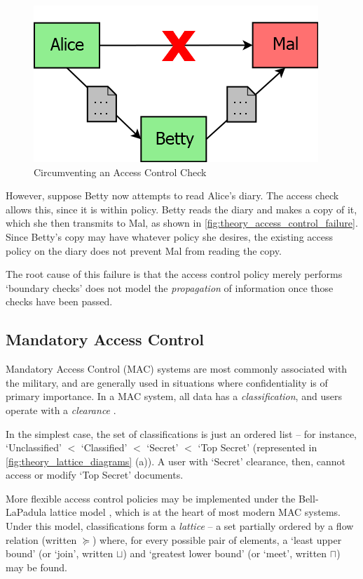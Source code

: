 \begin{figure}[h!]
	\centering
	\includegraphics[scale=0.5]{content/lit_theory/access_control_example.png}
	\caption{Circumventing an Access Control Check}
	\label{fig:theory_access_control_failure}
\end{figure}

However, suppose Betty now attempts to read Alice's diary. The access check allows this, since it is within policy. Betty reads the diary and makes a copy of it, which she then transmits to Mal, as shown in \autoref{fig:theory_access_control_failure}. Since Betty's copy may have whatever policy she desires, the existing access policy on the diary does not prevent Mal from reading the copy.

The root cause of this failure is that the access control policy merely performs `boundary checks' does not model the \textit{propagation} of information once those checks have been passed.

\subsection{Mandatory Access Control} \label{accesscontrol_mac}

Mandatory Access Control (MAC) systems are most commonly associated with the military, and are generally used in situations where confidentiality is of primary importance. In a MAC system, all data has a \textit{classification}, and users operate with a \textit{clearance} \cite{sandhu1994access}. 

In the simplest case, the set of classifications is just an ordered list -- for instance, `Unclassified' $ < $ `Classified' $ < $ `Secret' $ < $ `Top Secret' (represented in \autoref{fig:theory_lattice_diagrams} (a)). A user with `Secret' clearance, then, cannot access or modify `Top Secret' documents.

More flexible access control policies may be implemented under the Bell-LaPadula lattice model \cite{bell1973lattice}, which is at the heart of most modern MAC systems. Under this model, classifications form a \textit{lattice} -- a set partially ordered by a flow relation (written $ \succeq $) where, for every possible pair of elements, a `least upper bound' (or `join', written $ \sqcup $) and `greatest lower bound' (or `meet', written $ \sqcap $) may be found.

